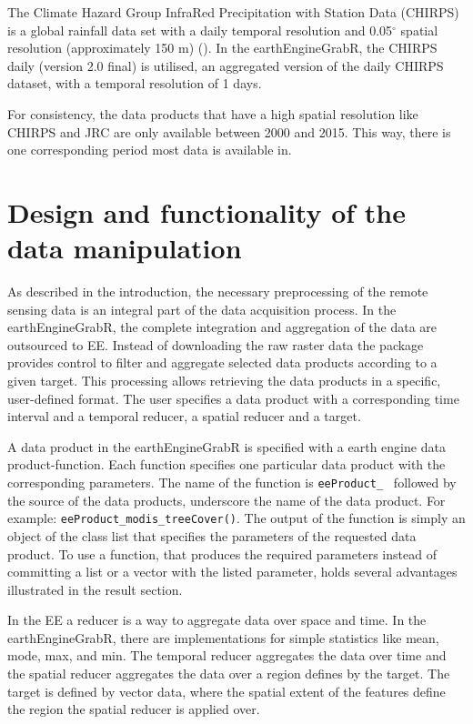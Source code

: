 The Climate Hazard Group InfraRed Precipitation with Station Data (CHIRPS) is a global rainfall data set with a daily temporal resolution and 0.05$^\circ$ spatial resolution (approximately 150 m) (\cite{funk2015climate}). In the earthEngineGrabR, the CHIRPS daily (version 2.0 final) is utilised, an aggregated version of the daily CHIRPS dataset, with a temporal resolution of 1 days.

For consistency, the data products that have a high spatial resolution like CHIRPS and JRC are only available between 2000 and 2015. This way, there is one corresponding period most data is available in.

\section{Design and functionality of the \\ data manipulation}

As described in the introduction, the necessary preprocessing of the remote sensing data is an integral part of the data acquisition process. In the earthEngineGrabR, the complete integration and aggregation of the data are outsourced to EE.
Instead of downloading the raw raster data the package provides control to filter and aggregate selected data products according to a given target. This processing allows retrieving the data products in a specific, user-defined format. The user specifies a data product with a corresponding time interval and a temporal reducer, a spatial reducer and a target. 

A data product in the earthEngineGrabR is specified with a earth engine data product-function. Each function specifies one particular data product with the corresponding parameters. The name of the function is \texttt{eeProduct\_ } followed by the source of the data products, underscore the name of the data product. For example: \texttt{eeProduct\_modis\_treeCover()}. The output of the function is simply an object of the class list that specifies the parameters of the requested data product. To use a function, that produces the required parameters instead of committing a list or a vector with the listed parameter, holds several advantages illustrated in the result section.

In the EE a reducer is a way to aggregate data over space and time. In the earthEngineGrabR, there are implementations for simple statistics like mean, mode, max, and min. The temporal reducer aggregates the data over time and the spatial reducer aggregates the data over a region defines by the target. 
The target is defined by vector data, where the spatial extent of the features define the region the spatial reducer is applied over.


